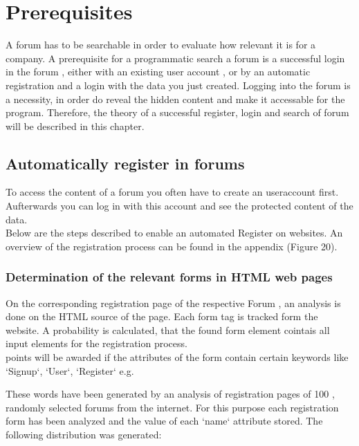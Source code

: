 \section{Prerequisites}
A forum has to be searchable in order to evaluate how relevant it is for a company.
A prerequisite for a programmatic search a forum is a successful login in the forum , either with an existing user account , or by an automatic registration and a login with the data you just created.
Logging into the forum is a necessity, in order do reveal the hidden content and make it accessable for the program. Therefore, the theory of a successful register, login and search of forum will be described in this chapter.

\subsection {Automatically register in forums}
To access the content of a forum you often have to create an useraccount first. Aufterwards you can log in with this account and see the protected content of the data.\\
Below are the steps described to enable an automated Register on websites. An overview of the registration process can be found in the appendix (Figure 20).

\subsubsection{Determination of the relevant forms in HTML web pages}
On the corresponding registration page of the respective Forum , an analysis is done on the HTML source of the page.
Each form tag is tracked form the website. A probability is calculated, that the found form element cointais all input elements for the registration process.\\
points will be awarded if the attributes of the form contain certain keywords like `Signup`, `User`, `Register` e.g.


These words have been generated by an analysis of  registration pages of 100 , randomly selected forums from the internet. For this purpose each registration form has been analyzed and the value of each `name` attribute stored. The following distribution was generated:

